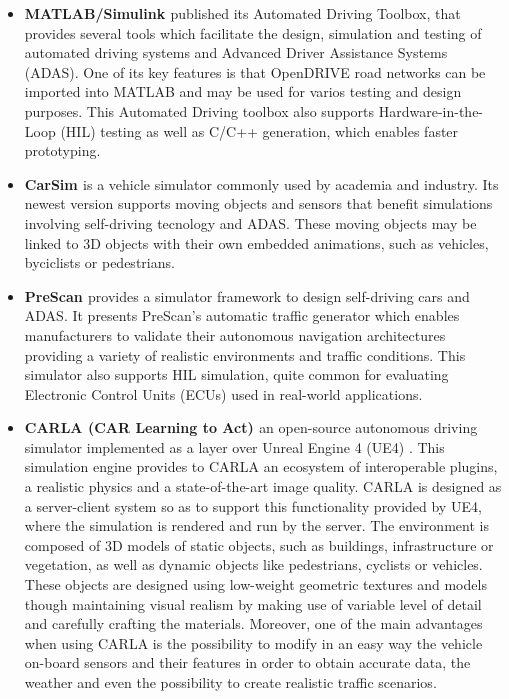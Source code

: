 \begin{itemize}
	
	\item \textbf{MATLAB/Simulink \cite{lattarulo2017complete}} published its Automated Driving Toolbox, that provides several tools which facilitate the design, simulation and testing of automated driving systems and Advanced Driver Assistance Systems (ADAS). One of its key features is that OpenDRIVE \cite{dupuis2010opendrive} road networks can be imported into MATLAB and may be used for varios testing and design purposes. This Automated Driving toolbox also supports Hardware-in-the-Loop (HIL) testing as well as C/C++ generation, which enables faster prototyping.
	
	\item \textbf{CarSim \cite{benekohal1988carsim}} is a vehicle simulator commonly used by academia and industry. Its newest version supports moving objects and sensors that benefit simulations involving self-driving tecnology and ADAS. These moving objects may be linked to 3D objects with their own embedded animations, such as vehicles, byciclists or pedestrians.
	
	\item \textbf{PreScan \cite{tideman2013simulation}} provides a simulator framework to design self-driving cars and ADAS. It presents PreScan's automatic traffic generator which enables manufacturers to validate their autonomous navigation architectures providing a variety of realistic environments and traffic conditions. This simulator also supports HIL simulation, quite common for evaluating Electronic Control Units (ECUs) used in real-world applications.
	
	\item \textbf{CARLA (CAR Learning to Act) \cite{dosovitskiy2017carla}} an open-source autonomous driving simulator implemented as a layer over Unreal Engine 4 (UE4) \cite{sanders2016introduction}. This simulation engine provides to CARLA an ecosystem of interoperable plugins, a realistic physics and a state-of-the-art image quality. CARLA is designed as a server-client system so as to support this functionality provided by UE4, where the simulation is rendered and run by the server. The environment is composed of 3D models of static objects, such as buildings, infrastructure or vegetation, as well as dynamic objects like pedestrians, cyclists or vehicles. These objects are designed using low-weight geometric textures and models though maintaining visual realism by making use of variable level of detail and carefully crafting the materials. Moreover, one of the main advantages when using CARLA is the possibility to modify in an easy way the vehicle on-board sensors and their features in order to obtain accurate data, the weather and even the possibility to create realistic traffic scenarios.
	

\end{itemize}
